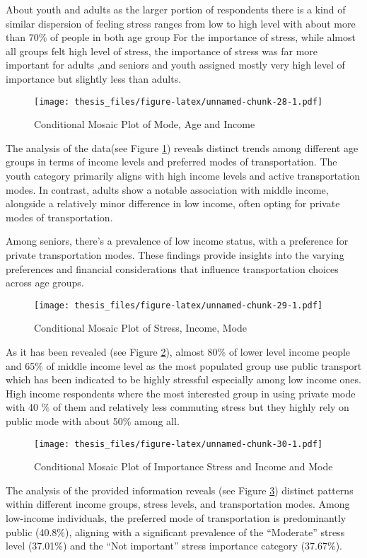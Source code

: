 \documentclass[
11pt, %
oneside, %
english, %
singlespacing, %
]{macthesis} %
\begin{document}
About youth and adults as the larger portion of respondents there is a kind of similar dispersion of feeling stress ranges from low to high level with about more than 70\% of people in both age group For the importance of stress, while almost all groups felt high level of stress, the importance of stress was far more important for adults ,and seniors and youth assigned mostly very high level of importance but slightly less than adults.
\begin{figure}
\centering
\texttt{[image: thesis\_files/figure-latex/unnamed-chunk-28-1.pdf]}
\caption{\label{fig:unnamed-chunk-28}\label{fig:Income-mode-Age}Conditional Mosaic Plot of Mode, Age and Income}
\end{figure}
The analysis of the data(see Figure \ref{fig:Income-mode-Age}) reveals distinct trends among different age groups in terms of income levels and preferred modes of transportation. The youth category primarily aligns with high income levels and active transportation modes. In contrast, adults show a notable association with middle income, alongside a relatively minor difference in low income, often opting for private modes of transportation.

Among seniors, there's a prevalence of low income status, with a preference for private transportation modes. These findings provide insights into the varying preferences and financial considerations that influence transportation choices across age groups.
\begin{figure}
\centering
\texttt{[image: thesis\_files/figure-latex/unnamed-chunk-29-1.pdf]}
\caption{\label{fig:unnamed-chunk-29}\label{fig:IMS}Conditional Mosaic Plot of Stress, Income, Mode}
\end{figure}
As it has been revealed (see Figure \ref{fig:IMS}), almost 80\% of lower level income people and 65\% of middle income level as the most populated group use public transport which has been indicated to be highly stressful especially among low income ones. High income respondents where the most interested group in using private mode with 40 \% of them and relatively less commuting stress but they highly rely on public mode with about 50\% among all.
\begin{figure}
\centering
\texttt{[image: thesis\_files/figure-latex/unnamed-chunk-30-1.pdf]}
\caption{\label{fig:unnamed-chunk-30}\label{fig:Income-mode-and-importance-stress}Conditional Mosaic Plot of Importance Stress and Income and Mode}
\end{figure}
The analysis of the provided information reveals (see Figure \ref{fig:Income-mode-and-importance-stress}) distinct patterns within different income groups, stress levels, and transportation modes. Among low-income individuals, the preferred mode of transportation is predominantly public (40.8\%), aligning with a significant prevalence of the ``Moderate'' stress level (37.01\%) and the ``Not important'' stress importance category (37.67\%).
\end{document}
